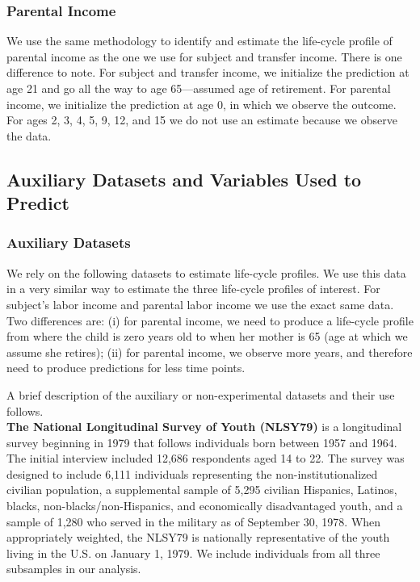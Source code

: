 \subsubsection{Parental Income}

\noindent We use the same methodology to identify and estimate the life-cycle profile of parental income as the one we use for subject and transfer income. There is one difference to note. For subject and transfer income, we initialize the prediction at age 21 and go all the way to age 65---assumed age of retirement. For parental income, we initialize the prediction at age 0, in which we observe the outcome. For ages 2, 3, 4, 5, 9, 12, and 15 we do not use an estimate because we observe the data.

\subsection{Auxiliary Datasets and Variables Used to Predict}

\subsubsection{Auxiliary Datasets}

\noindent We rely on the following datasets to estimate life-cycle profiles. We use this data in a very similar way to estimate the three life-cycle profiles of interest. For subject's labor income and parental labor income we use the exact same data. Two differences are: (i) for parental income, we need to produce a life-cycle profile from where the child is zero years old to when her mother is 65 (age at which we assume she retires); (ii) for parental income, we observe more years, and therefore need to produce predictions for less time points.

\noindent A brief description of the auxiliary or non-experimental datasets and their use follows.\\

\noindent \textbf{The National Longitudinal Survey of Youth (NLSY79)} is a longitudinal survey beginning in 1979 that follows individuals born between 1957 and 1964. The initial interview included 12,686 respondents aged 14 to 22. The survey was designed to include 6,111 individuals representing the non-institutionalized civilian population, a supplemental sample of 5,295 civilian Hispanics, Latinos, blacks, non-blacks/non-Hispanics, and economically disadvantaged youth, and a sample of 1,280 who served in the military as of September 30, 1978. When appropriately weighted, the NLSY79 is nationally representative of the youth living in the U.S. on January 1, 1979. We include individuals from all three subsamples in our analysis. \\

